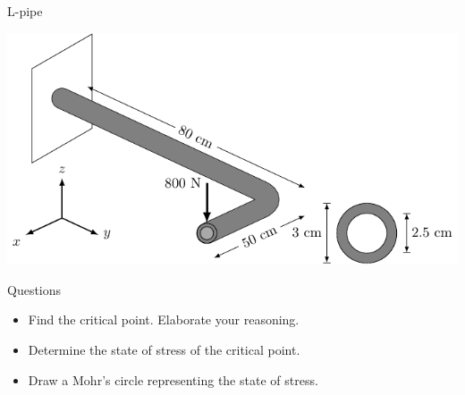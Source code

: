 \documentclass[10pt, svgnames]{beamer}
\begin{document}
\begin{frame}[label={sec:org20b8e88}]{L-pipe}
\begin{center}
\includegraphics[width=.9\linewidth]{pictures/l-pipe.pdf}
\end{center}
\end{frame}

\begin{frame}[label={sec:org15e4131}]{Questions}
\begin{itemize}
\item Find the critical point. Elaborate your reasoning.
\item Determine the state of stress of the critical point.
\item Draw a Mohr's circle representing the state of stress.
\end{itemize}
\end{frame}
\end{document}
